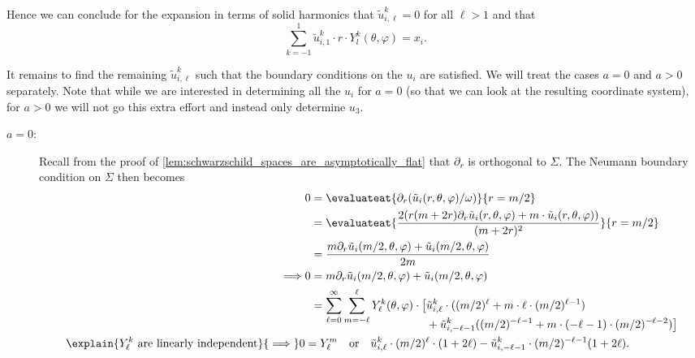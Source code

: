 \documentclass[titlepage,numbers=noenddot,oneside,%
cleardoublepage=empty,paper=a4,fontsize=11pt,%
english,%
]{scrartcl}
\begin{document}
Hence we can conclude for the expansion in terms of solid harmonics that \( \tilde{u}^k_{i,\ell}=0 \) for all \( \ell>1 \) and that
\begin{equation}
    \sum_{k=-1}^1 \tilde{u}^k_{i,1}\cdot r \cdot Y^k_l(\theta,\varphi)=x_i.\label{eq:schwarzschld_harmonic_linear_part}
\end{equation}

It remains to find the remaining \( \tilde{u}^k_{i,\ell} \) such that the boundary conditions on the \( u_i \) are satisfied. We will treat the cases \( a=0 \) and \( a>0 \) separately. Note that while we are interested in determining all the \( u_i \) for \( a=0 \) (so that we can look at the resulting coordinate system), for \( a>0 \) we will not go this extra effort and instead only determine \( u_3 \).
\begin{description}
    \item[\( a=0 \):] 
    Recall from the proof of \cref{lem:schwarzschild_spaces_are_asymptotically_flat} that \( \partial_r \) is orthogonal to \( \Sigma \). The Neumann boundary condition on \( \Sigma \) then becomes
    \begin{align*}
        &0\begin{aligned}[t]
            &=\evaluateat{\partial_{r} (\tilde{u}_i(r,\theta,\varphi)/\omega)}{r=m/2}\\
            &=\evaluateat{\frac{2(r(m+2r)\partial_r \tilde{u}_i(r,\theta,\varphi)+m\cdot \tilde{u}_i(r,\theta,\varphi))}{(m+2r)^2}}{r=m/2}\\
            &=\frac{m\partial_r \tilde{u}_i(m/2,\theta,\varphi)+\tilde{u}_i(m/2,\theta,\varphi)}{2m}
        \end{aligned}\\
        \implies &0\begin{aligned}[t]
            &=m \partial_r \tilde{u}_i(m/2,\theta,\varphi)+\tilde{u}_i(m/2,\theta,\varphi)\\
            &=\sum_{\ell=0}^\infty \sum_{m=-\ell}^\ell  Y_{\ell}^k(\theta,\varphi)\cdot  \begin{aligned}[t]
                \big[&\tilde{u}_{i,\ell}^k\cdot ((m/2)^\ell+m\cdot \ell\cdot (m/2)^{\ell-1})\\
                &+\tilde{u}^k_{i,-\ell-1}((m/2)^{-\ell-1}+m\cdot (-\ell-1)\cdot (m/2)^{-\ell-2})\big]
            \end{aligned}
        \end{aligned}\\
        \explain{\text{\( Y_{\ell}^k \) are linearly independent}}{\implies} 0&=Y^m_{\ell}\quad \text{or}\quad \tilde{u}_{i,\ell}^k\cdot (m/2)^\ell\cdot (1+2\ell)-\tilde{u}^k_{i,-\ell-1}\cdot (m/2)^{-\ell-1}(1+2\ell).

\end{align*}
\end{description}
\end{document}
